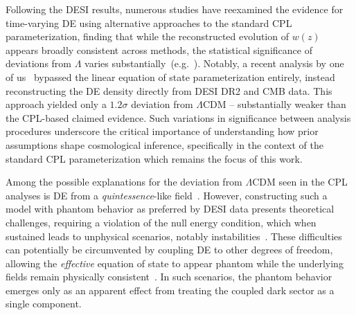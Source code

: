 Following the DESI results, numerous studies have reexamined the evidence for time-varying DE using alternative approaches to the standard CPL parameterization, finding that while the reconstructed evolution of $w(z)$ appears broadly consistent across methods, the statistical significance of deviations from $\Lambda$ varies substantially~(e.g.~\cite{DESI:2024kob,Luongo:2024fww,Shajib:2025tpd,Jiang:2024xnu,DESI:2025fii,Shlivko:2025fgv,Efstathiou:2025tie,Wang:2025vfb, Cheng:2025lod}). Notably, a recent analysis by one of us~\cite{Wang:2025vfb} bypassed the linear equation of state parameterization entirely, instead reconstructing the DE density directly from DESI DR2 and CMB data. This approach yielded only a $1.2\sigma$ deviation from $\Lambda$CDM -- substantially weaker than the CPL-based claimed evidence. Such variations in significance between analysis procedures underscore the critical importance of understanding how prior assumptions shape cosmological inference, specifically in the context of the standard CPL parameterization which remains the focus of this work.

Among the possible explanations for the deviation from $\Lambda$CDM seen in the CPL analyses is DE from a \textit{quintessence}-like field~\cite{Peebles:1987ek,Ratra:1987rm}. However, constructing such a model with phantom behavior as preferred by DESI data presents theoretical challenges, requiring a violation of the null energy condition, which when sustained leads to unphysical scenarios, notably instabilities~\cite{Caldwell:1999ew,Hu:2004kh}. These difficulties can potentially be circumvented by coupling DE to other degrees of freedom, allowing the \textit{effective} equation of state to appear phantom while the underlying fields remain physically consistent~\cite{Das:2005yj,Carroll:2004hc,Khoury:2025txd,Huey:2004qv,Brax:2023qyp,Smith:2024ibv,Chen:2025ywv}. In such scenarios, the phantom behavior emerges only as an apparent effect from treating the coupled dark sector as a single component.

